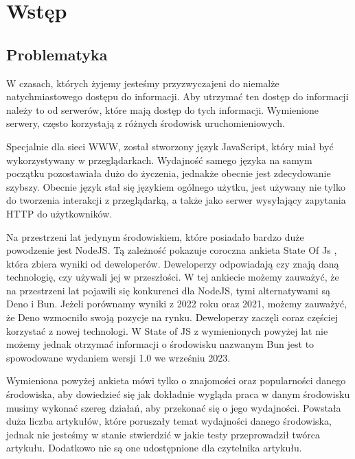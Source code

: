 \section*{Wstęp}

\subsection*{Problematyka}
W czasach, których żyjemy jesteśmy przyzwyczajeni do niemalże natychmiastowego dostępu do informacji. Aby utrzymać ten dostęp do informacji należy to od serwerów, które mają dostęp do tych informacji. Wymienione serwery, często korzystają z różnych środowisk uruchomieniowych.

Specjalnie dla sieci WWW, został stworzony język JavaScript, który miał być wykorzystywany w przeglądarkach. Wydajność samego języka na samym początku pozostawiała dużo do życzenia, jednakże obecnie jest zdecydowanie szybszy. Obecnie język stał się językiem ogólnego użytku, jest używany nie tylko do tworzenia interakcji z przeglądarką, a także jako serwer wysyłający zapytania HTTP do użytkowników.

Na przestrzeni lat jedynym środowiskiem, które posiadało bardzo duże powodzenie jest NodeJS. Tą zależność pokazuje coroczna ankieta State Of Js \cite{State_of_js:2021} \cite{State_of_js:2022}, która zbiera wyniki od deweloperów. Deweloperzy odpowiadają czy znają daną technologię, czy używali jej w przeszłości. W tej ankiecie możemy zauważyć, że na przestrzeni lat pojawili się konkurenci dla NodeJS, tymi alternatywami są Deno i Bun. Jeżeli porównamy wyniki z 2022 roku oraz 2021, możemy zauważyć, że Deno wzmocniło swoją pozycje na rynku. Deweloperzy zaczęli coraz częściej korzystać z nowej technologi. W State of JS z wymienionych powyżej lat nie możemy jednak otrzymać informacji o środowisku nazwanym Bun jest to spowodowane wydaniem wersji 1.0 we wrześniu 2023.

Wymieniona powyżej ankieta mówi tylko o znajomości oraz popularności danego środowiska, aby dowiedzieć się jak dokładnie wygląda praca w danym środowisku musimy wykonać szereg działań, aby przekonać się o jego wydajności. Powstała duża liczba artykułów, które poruszały temat wydajności danego środowiska, jednak nie jesteśmy w stanie stwierdzić w jakie testy przeprowadził twórca artykułu. Dodatkowo nie są one udostępnione dla czytelnika artykułu.